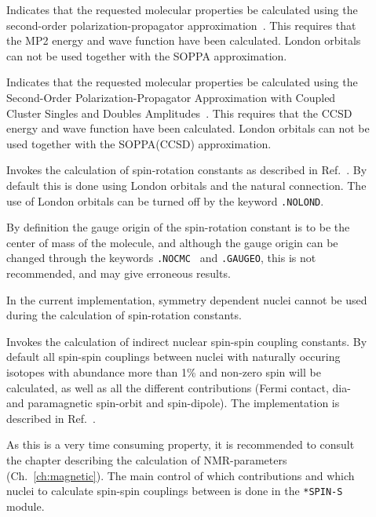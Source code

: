 \begin{description}
\item[] Indicates that the requested molecular properties
be calculated using the second-order polarization-propagator
approximation~\cite{mjpekdtehjajjojcp}. This requires that the MP2 energy and wave
function have been calculated. London orbitals can not be used
together with the SOPPA approximation.

\item[] Indicates that the requested molecular properties
be calculated using the Second-Order Polarization-Propagator Approximation with Coupled
Cluster Singles and Doubles Amplitudes~\cite{soppaccsd,tejospastcan100,ekdspasjpca102,ctocd}. 
This requires that the CCSD energy and wave function have been calculated. 
London orbitals can not be used together with the SOPPA(CCSD) approximation.

\item[] Invokes the calculation of
spin-rotation
constants as described in Ref.~\cite{jgkrthjcp105}. By default this is
done using London orbitals  and the 
natural connection. The use of London
orbitals can be turned off by the keyword \verb|.NOLOND|.

By definition the gauge origin of the
spin-rotation constant is to be the 
center of mass of the molecule, and although the
gauge origin can be 
changed through the keywords \verb|.NOCMC | and \verb|.GAUGEO|, this
is not recommended, and may give erroneous results.

In the current implementation, symmetry dependent nuclei cannot be
used during the calculation of spin-rotation constants.

\item[] Invokes the calculation of indirect nuclear
spin-spin coupling constants. By default all
spin-spin couplings 
between nuclei with naturally occuring isotopes with abundance more
than 1\% and non-zero spin will be calculated, as well as all the different
contributions (Fermi contact, dia- and paramagnetic spin-orbit and
spin-dipole). The implementation is described in 
Ref.~\cite{ovhapjhjajsbpthjcp96}. 

As this is a very time consuming property, it is recommended to 
consult the chapter describing the calculation of NMR-parameters
(Ch.~\ref{ch:magnetic}). The main control of which
contributions and which nuclei to calculate spin-spin couplings
between is done in the \verb|*SPIN-S| module.


\end{description}

